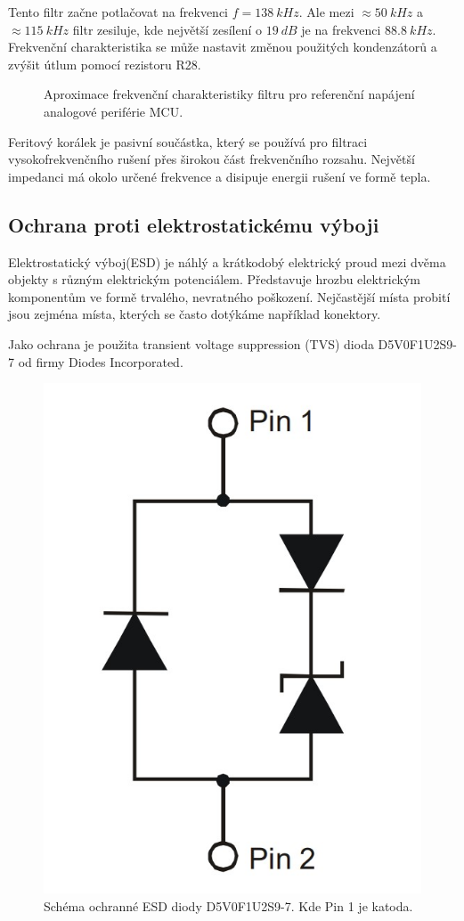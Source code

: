 Tento filtr začne potlačovat na frekvenci $f = 138 \ kHz$. Ale mezi $\approx 50 \ kHz$ a $ \approx 115 \ kHz$ filtr zesiluje, kde největší zesílení o $19 \ dB$ je na frekvenci $88.8 \ kHz$.
Frekvenční charakteristika se může nastavit změnou použitých kondenzátorů a zvýšit útlum pomocí rezistoru R28.

\begin{figure}[H]
    \caption{Aproximace frekvenční charakteristiky filtru pro referenční napájení analogové periférie MCU.}
    \label{fig:stm32_vref_response}
\end{figure}


Feritový korálek je pasivní součástka, který se používá pro filtraci vysokofrekvenčního rušení přes širokou část frekvenčního rozsahu. Největší impedanci má okolo určené frekvence a disipuje energii rušení ve formě tepla.
\subsection{Ochrana proti elektrostatickému výboji}
Elektrostatický výboj(ESD) je náhlý a krátkodobý elektrický proud mezi dvěma objekty s různým elektrickým potenciálem. Představuje hrozbu elektrickým komponentům ve formě trvalého, nevratného poškození. Nejčastější místa probití jsou zejména místa, kterých se často dotýkáme například konektory.
\par
Jako ochrana je použita transient voltage suppression (TVS) dioda D5V0F1U2S9-7 od firmy Diodes Incorporated.

\begin{figure}[H]
    \centering
    \includegraphics[width=0.4\linewidth]{pictures/esd_diode_schema.jpg}
    \caption{Schéma ochranné ESD diody D5V0F1U2S9-7. Kde Pin 1 je katoda. \cite{cite:ESD}}
    \label{fig:esd_diode}
\end{figure}

